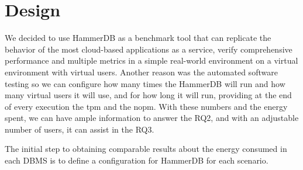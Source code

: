 \section{Design}
\label{sc:Design}



We decided to use HammerDB as a benchmark tool that can replicate the behavior of the most cloud-based applications as a service, verify comprehensive performance and multiple metrics in a simple real-world environment on a virtual environment with virtual users\cite{hammerdb}. Another reason was the automated software testing \cite{hammerdb} so we can configure how many times the HammerDB will run and how many virtual users it will use, and for how long it will run, providing at the end of every execution the \gls{tpm} and the \gls{nopm}. With these numbers and the energy spent, we can have ample information to answer the RQ2, and with an adjustable number of users, it can assist in the RQ3.



 
 The initial step to obtaining comparable results about the energy consumed in each DBMS is to define a configuration for HammerDB for each scenario. 
 
 




